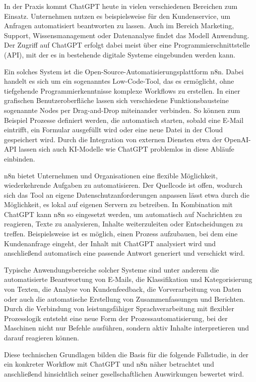 \documentclass[utf8,biblatex]{bremerhaven_lni}
\begin{document}
In der Praxis kommt ChatGPT heute in vielen verschiedenen Bereichen zum Einsatz. Unternehmen nutzen es beispielsweise für den Kundenservice, um Anfragen automatisiert beantworten zu lassen. Auch im Bereich Marketing, Support, Wissensmanagement oder Datenanalyse findet das Modell Anwendung. Der Zugriff auf ChatGPT erfolgt dabei meist über eine Programmierschnittstelle (API), mit der es in bestehende digitale Systeme eingebunden werden kann.

Ein solches System ist die Open-Source-Automatisierungsplattform n8n. Dabei handelt es sich um ein sogenanntes Low-Code-Tool, das es ermöglicht, ohne tiefgehende Programmierkenntnisse komplexe Workflows zu erstellen. In einer grafischen Benutzeroberfläche lassen sich verschiedene Funktionsbausteine sogenannte Nodes per Drag-and-Drop miteinander verbinden. So können zum Beispiel Prozesse definiert werden, die automatisch starten, sobald eine E-Mail eintrifft, ein Formular ausgefüllt wird oder eine neue Datei in der Cloud gespeichert wird. Durch die Integration von externen Diensten etwa der OpenAI-API lassen sich auch KI-Modelle wie ChatGPT problemlos in diese Abläufe einbinden.

n8n bietet Unternehmen und Organisationen eine flexible Möglichkeit, wiederkehrende Aufgaben zu automatisieren. Der Quellcode ist offen, wodurch sich das Tool an eigene Datenschutzanforderungen anpassen lässt etwa durch die Möglichkeit, es lokal auf eigenen Servern zu betreiben. In Kombination mit ChatGPT kann n8n so eingesetzt werden, um automatisch auf Nachrichten zu reagieren, Texte zu analysieren, Inhalte weiterzuleiten oder Entscheidungen zu treffen. Beispielsweise ist es möglich, einen Prozess aufzubauen, bei dem eine Kundenanfrage eingeht, der Inhalt mit ChatGPT analysiert wird und anschließend automatisch eine passende Antwort generiert und verschickt wird.

Typische Anwendungsbereiche solcher Systeme sind unter anderem die automatisierte Beantwortung von E-Mails, die Klassifikation und Kategorisierung von Texten, die Analyse von Kundenfeedback, die Vorverarbeitung von Daten oder auch die automatische Erstellung von Zusammenfassungen und Berichten. Durch die Verbindung von leistungsfähiger Sprachverarbeitung mit flexibler Prozesslogik entsteht eine neue Form der Prozessautomatisierung, bei der Maschinen nicht nur Befehle ausführen, sondern aktiv Inhalte interpretieren und darauf reagieren können.

Diese technischen Grundlagen bilden die Basis für die folgende Fallstudie, in der ein konkreter Workflow mit ChatGPT und n8n näher betrachtet und anschließend hinsichtlich seiner gesellschaftlichen Auswirkungen bewertet wird.
\end{document}
